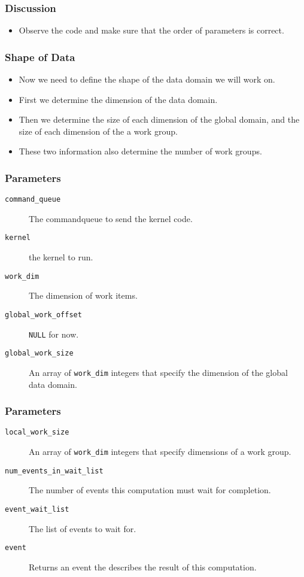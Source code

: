 \documentclass{beamer}
\begin{document}
\begin{frame}
  \frametitle{Discussion}
  \begin{itemize}
    \item Observe the code and make sure that the order of parameters
      is correct.
  \end{itemize}
\end{frame}

\begin{frame}
  \frametitle{Shape of Data}
  \begin{itemize}
  \item Now we need to define the shape of the data domain we will
    work on.
  \item First we determine the dimension of the data domain.
  \item Then we determine the size of each dimension of the global
    domain, and the size of each dimension of the a work group.
  \item These two information also determine the number of work groups.
  \end{itemize}
\end{frame}

\begin{frame}
\end{frame}

\begin{frame}
  \frametitle{Parameters}
  \begin{description}
  \item [\tt command\_queue] The commandqueue to send the kernel code.
  \item [\tt kernel] the kernel to run.
  \item [\tt work\_dim] The dimension of work items.
  \item [\tt global\_work\_offset] {\tt NULL} for now.
  \item [\tt global\_work\_size] An array of {\tt work\_dim} integers
    that specify the dimension of the global data domain.
  \end{description}
\end{frame}

\begin{frame}
  \frametitle{Parameters}
  \begin{description}
  \item [\tt local\_work\_size] An array of {\tt work\_dim} integers
    that specify dimensions of a work group.
  \item [\tt num\_events\_in\_wait\_list] The number of events this
    computation must wait for completion.
  \item [\tt event\_wait\_list] The list of events to wait for.
  \item [\tt event] Returns an event the describes the result of this
    computation.
  \end{description}
\end{frame}
\end{document}
